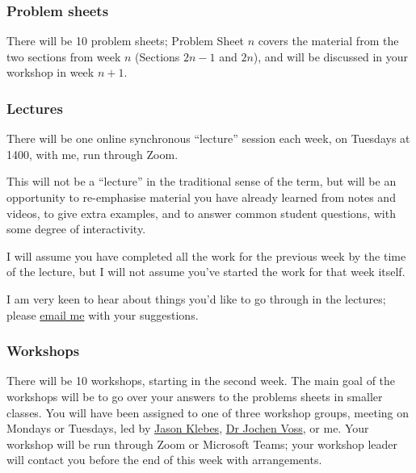 \documentclass[
  a4paper,
]{article}
\theoremstyle{definition}
\theoremstyle{definition}
\theoremstyle{definition}
\theoremstyle{remark}
\begin{document}
\hypertarget{problem-sheets}{%
\subsubsection*{Problem sheets}\label{problem-sheets}}

There will be 10 problem sheets; Problem Sheet \(n\) covers the material from the two sections from week \(n\) (Sections \(2n -1\) and \(2n\)), and will be discussed in your workshop in week \(n+1\).

\hypertarget{lectures}{%
\subsubsection*{Lectures}\label{lectures}}

There will be one online synchronous ``lecture'' session each week, on Tuesdays at 1400, with me, run through Zoom.

This will not be a ``lecture'' in the traditional sense of the term, but will be an opportunity to re-emphasise material you have already learned from notes and videos, to give extra examples, and to answer common student questions, with some degree of interactivity.

I will assume you have completed all the work for the previous week by the time of the lecture, but I will not assume you've started the work for that week itself.

I am very keen to hear about things you'd like to go through in the lectures; please \href{mailto:m.aldridge@leeds.ac.uk}{email me} with your suggestions.

\hypertarget{workshops}{%
\subsubsection*{Workshops}\label{workshops}}

There will be 10 workshops, starting in the second week. The main goal of the workshops will be to go over your answers to the problems sheets in smaller classes. You will have been assigned to one of three workshop groups, meeting on Mondays or Tuesdays, led by \href{https://eps.leeds.ac.uk/maths/pgr/8790/jason-klebes}{Jason Klebes}, \href{http://www1.maths.leeds.ac.uk/~voss/}{Dr Jochen Voss}, or me. Your workshop will be run through Zoom or Microsoft Teams; your workshop leader will contact you before the end of this week with arrangements.
\end{document}

